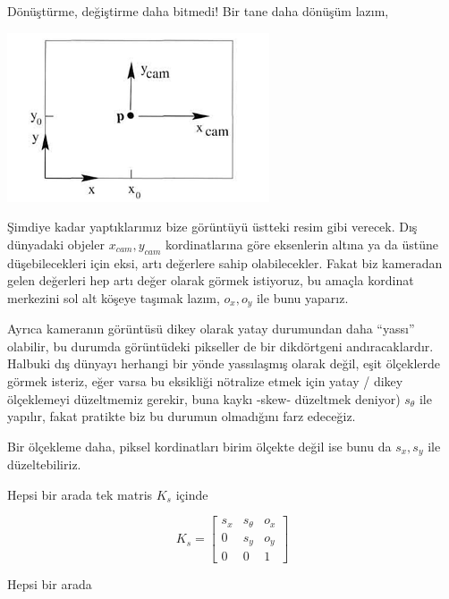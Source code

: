 \documentclass[12pt,fleqn]{article}\usepackage{../../common}
\begin{document}
Dönüştürme, değiştirme daha bitmedi! Bir tane daha dönüşüm lazım, 

\includegraphics[height=5cm]{pixcoord.png}

Şimdiye kadar yaptıklarımız bize görüntüyü üstteki resim gibi verecek. Dış
dünyadaki objeler $x_{cam},y_{cam}$ kordinatlarına göre eksenlerin altına ya da
üstüne düşebilecekleri için eksi, artı değerlere sahip olabilecekler. Fakat biz
kameradan gelen değerleri hep artı değer olarak görmek istiyoruz, bu amaçla
kordinat merkezini sol alt köşeye taşımak lazım, $o_x,o_y$ ile bunu yaparız.

Ayrıca kameranın görüntüsü dikey olarak yatay durumundan daha ``yassı''
olabilir, bu durumda görüntüdeki pikseller de bir dikdörtgeni
andıracaklardır. Halbuki dış dünyayı herhangi bir yönde yassılaşmış olarak
değil, eşit ölçeklerde görmek isteriz, eğer varsa bu eksikliği nötralize etmek
için yatay / dikey ölçeklemeyi düzeltmemiz gerekir, buna kaykı -skew- düzeltmek
deniyor) $s_\theta$ ile yapılır, fakat pratikte biz bu durumun olmadığını farz
edeceğiz.

Bir ölçekleme daha, piksel kordinatları birim ölçekte değil ise bunu da
$s_x,s_y$ ile düzeltebiliriz. 

Hepsi bir arada tek matris $K_s$ içinde

$$ K_s = \left[\begin{array}{rrr}
s_x & s_\theta & o_x \\
0 & s_y & o_y \\
0 & 0 & 1
\end{array}\right] $$

Hepsi bir arada
\end{document}
